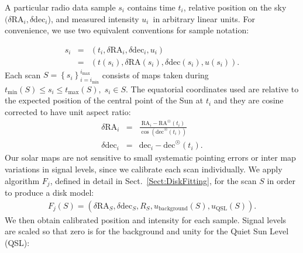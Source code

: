 \documentclass{aa}
\newcommand{\eqnl}[2]{\begin{eqnarray}\label{#1}#2\end{eqnarray}}
\newcommand{\s}[2]{{#1}_{\mathrm{#2}}}
\begin{document}
A particular radio data sample $s_i$ contains time $t_i$, relative position on the sky $(\delta \mathrm{RA}_i, \delta 
\mathrm{dec}_i$), and measured intensity $u_i$ in arbitrary linear units. For convenience, we use two equivalent 
conventions for sample notation:

\eqnl{radio_sample}{
s_i &=& 
\left( t_i, \delta \mathrm{RA}_i, \delta \mathrm{dec}_i, u_i \right) \\ \nonumber
&=& \left( t(s_i), \delta \mathrm{RA}(s_i), \delta \mathrm{dec}(s_i), u(s_i) \right) \text{.}
}
Each scan $S = \left\{ s_i \right\}_{i=\s{i}{min}}^{\s{i}{max}}$ consists of maps taken 
during $\s{t}{min}(S) \le s_i \le \s{t}{max}(S), \; s_i \in S$.
The equatorial coordinates used are relative to the expected position of the central point
of the Sun at $t_i$ and they are cosine corrected to have unit aspect ratio:
\eqnl{relative_radec}{
\delta \mathrm{RA}_i  &=& \frac{\mathrm{RA}_i - \mathrm{RA}^{\astrosun}(t_i)}{\cos \left( \mathrm{dec}^{\astrosun}(t_i) \right)} \\
\delta \mathrm{dec}_i &=& \mathrm{dec}_i - \mathrm{dec}^{\astrosun}(t_i) \text{.}
}
Our solar maps are not sensitive to small systematic pointing errors or inter map variations in signal levels, since we calibrate each scan individually.
We apply algorithm $F_j$,
defined in detail in Sect.~\ref{Sect:DiskFitting},
for the scan $S$ in order to produce a disk model:
\eqnl{disk_model}{
F_j(S) = \left( \delta \mathrm{RA}_S, \delta \mathrm{dec}_S, R_S, \s{u}{background}(S), \s{u}{QSL}(S) \right) \text{.}
}
We then obtain calibrated position and intensity for each sample. Signal levels are scaled so that zero is for the background and unity for the Quiet Sun Level (QSL):
\end{document}
